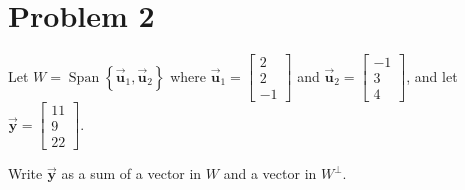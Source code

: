 \documentclass[letter,11pt]{article}
\theoremstyle{definition}
\begin{document}
\section{Problem 2}
Let $W=\operatorname{Span}\left\{\vec{\boldsymbol{u}}_{1}, \vec{\boldsymbol{u}}_{2}\right\}$ where $\vec{\boldsymbol{u}}_{1}=\begin{bmatrix} 2 \\ 2 \\ -1 \end{bmatrix}$ and $\vec{\boldsymbol{u}}_{2}=\begin{bmatrix} -1 \\ 3 \\ 4 \end{bmatrix}$, and let $\vec{\boldsymbol{y}}=\begin{bmatrix} 11 \\ 9 \\ 22 \end{bmatrix}$.

Write $\vec{\boldsymbol{y}}$ as a sum of a vector in $W$ and a vector in $W^{\perp}$.
\end{document}
